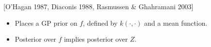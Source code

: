 \documentclass[usenames,dvipsnames]{beamer}
\begin{document}
\begin{frame}[plain, t]
	\titlebodyskip
	\headerbar
	{
	}
	\bodyheaderskip
	\slidebody
	{
		{\color{mydarkblue}[O'Hagan 1987, Diaconis 1988, Rasmussen \& Ghahramani 2003]	}
			\begin{itemize}
			
			\pause
				\item Places a GP prior on $f$, defined by $k(\cdot, \cdot)$ and a mean function.
				\item Posterior over $f$ implies posterior over $Z$.
				

\end{itemize}}
\end{frame}
\end{document}
